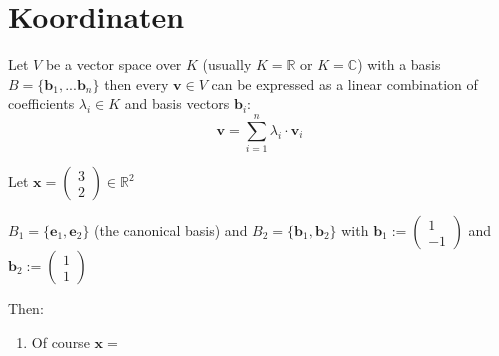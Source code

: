 
\section{Koordinaten}


Let $V$ be a vector space over $K$ (usually $K=\mathbb{R}$ or $K=\mathbb{C}$) with a basis $B=\{\bm{b}_1, ... \bm{b}_n\}$ then every $\bm{v} \in V$ can be expressed as a linear combination of coefficients $\lambda_i \in K$ and basis vectors $\bm{b}_i$:
\begin{equation}
    \bm{v} = \sum_{i=1}^n \lambda_i \cdot \bm{v}_i
\end{equation} 

\begin{example}
    Let $\bm{x}=\begin{pmatrix}
    3\\2
    \end{pmatrix} \in \mathbb{R}^2$
    
    $B_1 = \{\bm{e}_1, \bm{e}_2\}$ (the canonical basis) and $B_2=\{\bm{b}_1, \bm{b}_2\}$ with $\bm{b}_1:=\begin{pmatrix}
    1\\-1
    \end{pmatrix}$ and $\bm{b}_2:=\begin{pmatrix}
    1\\1
    \end{pmatrix}$

    Then: 
    \begin{enumerate}[itemsep=3pt, topsep=3pt]
        \item Of course $\bm{x}=$
    \end{enumerate}
\end{example}